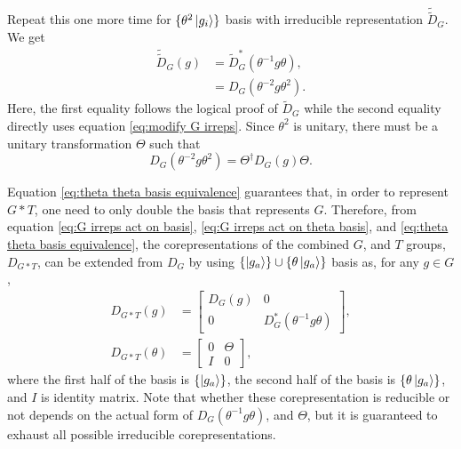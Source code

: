 \documentclass[preprint, 12pt]{revtex4-2}
\numberwithin{equation}{section}
\begin{document}
Repeat this one more time for $\{\theta^2\ket{g_i}\}$ basis with irreducible representation $\tilde{\tilde{D}}_G$. We get
\begin{equation}\label{eq:theta theta basis G irreps}
    \begin{aligned}
        \tilde{\tilde{D}}_G(g) &= \tilde{D}^\ast_G(\theta^{-1}g\theta), \\
        &= D_G(\theta^{-2}g\theta^2).
    \end{aligned}
\end{equation}
Here, the first equality follows the logical proof of $\tilde{D}_G$ while the second equality directly uses equation \ref{eq:modify G irreps}. Since $\theta^2$ is unitary, there must be a unitary transformation $\Theta$ such that
\begin{equation}\label{eq:theta theta basis equivalence}
    D_G(\theta^{-2}g\theta^2) = \Theta^\dagger D_G(g)\Theta.
\end{equation}

Equation \ref{eq:theta theta basis equivalence} guarantees that, in order to represent $G\ast T$, one need to only double the basis that represents $G$. Therefore, from equation \ref{eq:G irreps act on basis}, \ref{eq:G irreps act on theta basis}, and \ref{eq:theta theta basis equivalence}, the corepresentations of the combined $G$, and $T$ groups, $D_{G\ast T}$, can be extended from $D_{G}$ by using $\{\ket{g_a}\}\cup\{\theta\ket{g_a}\}$ basis as, for any $g\in G$,
\begin{equation}\label{eq:G*T Coreps}
    \begin{aligned}
        D_{G\ast T}(g) &=   \begin{bmatrix}
                                D_{G}(g) & 0 \\
                                0 & D_{G}^\ast(\theta^{-1}g\theta)  
                            \end{bmatrix}, \\
        D_{G\ast T}(\theta) &=  \begin{bmatrix}
                                    0 & \Theta \\
                                    I & 0 
                                \end{bmatrix},
    \end{aligned}
\end{equation}
where the first half of the basis is $\{\ket{g_a}\}$, the second half of the basis is $\{\theta\ket{g_a}\}$, and $I$ is identity matrix. Note that whether these corepresentation is reducible or not depends on the actual form of $D_{G}(\theta^{-1}g\theta)$, and $\Theta$, but it is guaranteed to exhaust all possible irreducible corepresentations.
\end{document}
